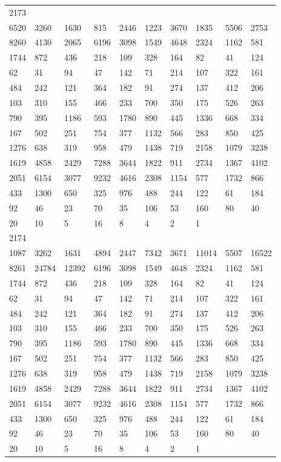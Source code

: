 \begin{longtable}{*{10}{l}}
2173&&&&&&&&&\\
6520& 3260& 1630& 815& 2446& 1223& 3670& 1835& 5506& 2753\\
8260& 4130& 2065& 6196& 3098& 1549& 4648& 2324& 1162& 581\\
1744& 872& 436& 218& 109& 328& 164& 82& 41& 124\\
62& 31& 94& 47& 142& 71& 214& 107& 322& 161\\
484& 242& 121& 364& 182& 91& 274& 137& 412& 206\\
103& 310& 155& 466& 233& 700& 350& 175& 526& 263\\
790& 395& 1186& 593& 1780& 890& 445& 1336& 668& 334\\
167& 502& 251& 754& 377& 1132& 566& 283& 850& 425\\
1276& 638& 319& 958& 479& 1438& 719& 2158& 1079& 3238\\
1619& 4858& 2429& 7288& 3644& 1822& 911& 2734& 1367& 4102\\
2051& 6154& 3077& 9232& 4616& 2308& 1154& 577& 1732& 866\\
433& 1300& 650& 325& 976& 488& 244& 122& 61& 184\\
92& 46& 23& 70& 35& 106& 53& 160& 80& 40\\
20& 10& 5& 16& 8& 4& 2& 1& \\

2174&&&&&&&&&\\
1087& 3262& 1631& 4894& 2447& 7342& 3671& 11014& 5507& 16522\\
8261& 24784& 12392& 6196& 3098& 1549& 4648& 2324& 1162& 581\\
1744& 872& 436& 218& 109& 328& 164& 82& 41& 124\\
62& 31& 94& 47& 142& 71& 214& 107& 322& 161\\
484& 242& 121& 364& 182& 91& 274& 137& 412& 206\\
103& 310& 155& 466& 233& 700& 350& 175& 526& 263\\
790& 395& 1186& 593& 1780& 890& 445& 1336& 668& 334\\
167& 502& 251& 754& 377& 1132& 566& 283& 850& 425\\
1276& 638& 319& 958& 479& 1438& 719& 2158& 1079& 3238\\
1619& 4858& 2429& 7288& 3644& 1822& 911& 2734& 1367& 4102\\
2051& 6154& 3077& 9232& 4616& 2308& 1154& 577& 1732& 866\\
433& 1300& 650& 325& 976& 488& 244& 122& 61& 184\\
92& 46& 23& 70& 35& 106& 53& 160& 80& 40\\
20& 10& 5& 16& 8& 4& 2& 1& \\


\end{longtable}
